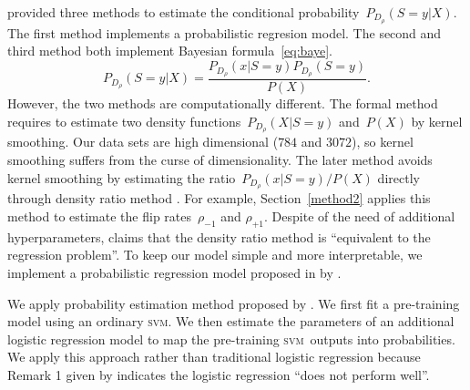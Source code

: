 \documentclass[12pt]{article} %
\newcommand{\svm}{\textsc{svm}}
\newcommand{\rhoo}{\rho_{+1}}
\newcommand{\rhoz}{\rho_{-1}}
\begin{document}
\citet{liu2016classification} provided three methods to estimate the conditional probability~$P_{D_\rho}(S=y|X)$.
The first method implements a probabilistic regresion model.
The second and third method both implement Bayesian formula~\eqref{eq:baye}.
\begin{equation*}
   P_{D_\rho}(S=y|X)=\frac{P_{D_\rho}(x|S=y)P_{D_\rho}(S=y)}{P(X)}.
\end{equation*}
However, the two methods are computationally different. The formal method requires to estimate two density functions~$P_{D_\rho}(X|S=y)$ and~$P(X)$ by kernel smoothing. Our data sets are high dimensional ($784$ and $3072$), so kernel smoothing suffers from the curse of dimensionality. The later method avoids kernel smoothing by estimating the ratio~$P_{D_\rho}(x|S=y)/P(X)$ directly through density ratio method \citep{liu2016classification}. For example, Section~\ref{method2} applies this method to estimate the flip rates~$\rhoz$ and $\rhoo$. Despite of the need of additional hyperparameters,  \citet{Sugiyama10densityratio} claims that the density ratio method is ``equivalent to the regression problem''. To keep our model simple and more interpretable, we implement a probabilistic regression model proposed in by \citet[Section~5.1]{liu2016classification}.

We apply probability estimation method proposed by \citet{Platt99probabilisticoutputs}. We first fit a pre-training model using an ordinary \svm . We then estimate the parameters of an additional logistic regression model to map the pre-training \svm\ outputs into probabilities. We apply this approach rather than traditional logistic regression because Remark 1 given by \citet{liu2016classification} indicates the logistic regression ``does not perform well''.
\end{document}
